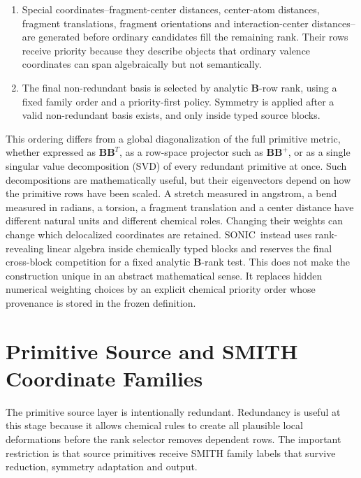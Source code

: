\documentclass[journal=jctcce,manuscript=article,layout=traditional]{achemso}
\newcommand{\SONIC}{SONIC}
\newcommand{\Bmat}{\mathbf{B}}
\theoremstyle{definition}
\begin{document}
\begin{enumerate}
including butterfly coordinates around bonds shared by two rings.  These rows
remain in ring/torsional source blocks during reduction and symmetry
adaptation; they are not relabelled as generic torsions.
\item Special coordinates--fragment-center distances, center-atom distances,
fragment translations, fragment orientations and interaction-center distances--
are generated before ordinary candidates fill the remaining rank.  Their rows
receive priority because they describe objects that ordinary valence coordinates
can span algebraically but not semantically.
\item The final non-redundant basis is selected by analytic \(\Bmat\)-row rank,
using a fixed family order and a priority-first policy.  Symmetry is applied
after a valid non-redundant basis exists, and only inside typed source
blocks.
\end{enumerate}

This ordering differs from a global diagonalization of the full primitive
metric, whether expressed as \( \Bmat \Bmat^T \), as a row-space projector such
as \( \Bmat \Bmat^+ \), or as a single singular value decomposition (SVD) of every redundant primitive at
once.  Such decompositions are mathematically useful, but their eigenvectors
depend on how the primitive rows have been scaled.  A stretch measured in
angstrom, a bend measured in radians, a torsion, a fragment translation and a
center distance have different natural units and different chemical roles.
Changing their weights can change which delocalized coordinates are retained.
\SONIC\ instead uses rank-revealing linear algebra inside chemically typed
blocks and reserves the final cross-block competition for a fixed
analytic \(\Bmat\)-rank test.  This does not make the construction unique in an
abstract mathematical sense.  It replaces hidden numerical weighting choices by
an explicit chemical priority order whose provenance is stored in the frozen
definition.

\section{Primitive Source and SMITH Coordinate Families}

The primitive source layer is intentionally redundant.  Redundancy is useful at this
stage because it allows chemical rules to create all plausible local
deformations before the rank selector removes dependent rows.  The important
restriction is that source primitives receive SMITH family labels that survive
reduction, symmetry adaptation and output.
\end{document}

